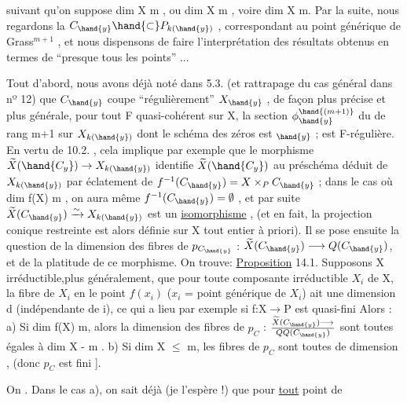 
suivant qu'on suppose  dim X \hand{$\geqslant$} m , ou  dim X \hand{$\leqslant$} m , voire dim X \hand{$<$} m.
Par la suite, nous regardons la $C_{\hand{y}}\hand{\subset} P_{k(\hand{y})}$\hand{)} , correspondant au point
générique  de  Grass$^{m+1}$ , et nous dispensons  de faire l'interprétation
des résultats obtenus en termes de  ``presque tous les points'' ...

Tout d'abord, nous avons déjà noté dans 5.3. (et rattrapage du
cas général dans nº 12)  que $C_{\hand{y}}$  coupe ``régulièrement'' $X_{\hand{y}}$ , de façon
plus précise et plus générale, pour tout F quasi-cohérent sur X,
la section $\phi_{\hand{y}}^{\hand{(m+1)}}$ du  de rang  m+1  sur  $X_{k(\hand{y})}$  dont le
schéma des zéros est $_{\hand{y}}$ ; est F-régulière. En vertu de 10.2. , cela
implique par exemple que le morphisme  $\widetilde{X}(\hand{C_y})\to X_{k(\hand{y})}$ identifie $\widetilde{X}(\hand{C_y})$ au préschéma
déduit de $X_{k(\hand{y})}$ par éclatement de $f^{-1}(C_{\hand{y}})= X\times_P C_{\hand{y}}$ ;   dans le cas
où  dim f(X) \hand{$\leqslant$} m ,  on  aura même  $f^{-1}(C_{\hand{y}}) = \emptyset$ , et  par suite
$\widetilde{X}(C_{\hand{y}}) \xrightarrow{\sim} X_{k(\hand{y})}$  est un \uline{isomorphisme} , (et en fait, la \hand{\unsure{)}}projection conique
restreinte  est alors définie sur X tout entier à priori). Il se pose
ensuite la question de la dimension des fibres de $p_{C_{\hand{y}}}$ : $\widetilde{X}(C_{\hand{y}}) \longrightarrow Q(C_{\hand{y}})$,
et de la platitude de ce morphisme. On trouve:
\uline{Proposition} 14.1.   Supposons X irréductible,plus
généralement, que  pour toute composante irréductible $X_i$ de X, la fibre
de $X_i$ en le point $f(x_i)$  ($x_i$ = point générique de $X_i$) ait une dimension d
(indépendante de i), ce qui a lieu par exemple  si f:X$\to$P est quasi-fini\hand{,} 
Alors :     a)  Si  dim f(X) \hand{$>$} m, alors la dimension  des fibres de
$p_C$  : $\widetilde{X}(C_{\hand{y}}) \longrightarrow \over{Q}{Q}(C_{\hand{y}})$  sont toutes égales à  dim X - m .   b)  Si dim X
$\leqslant$ m,  les fibres de $p_C$   sont toutes de dimension ,  (donc $p_C$ est fini   ].

On 
. Dans le cas a), 
  on sait déjà (je l'espère !) que pour \uline{tout}  point  de

